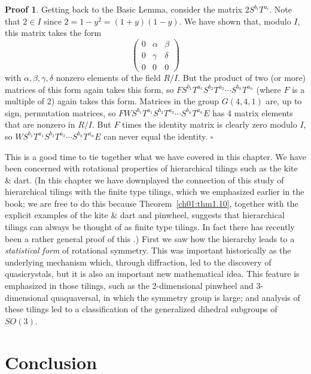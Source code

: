 \documentclass[reqno]{stml-l}
\theoremstyle{plain}
\theoremstyle{definition}
\newtheorem*{proof*}{Proof}
\numberwithin{equation}{chapter}
\begin{document}
\begin{proof*}
Getting back to the Basic Lemma, consider the matrix $2S^{b_{i}}T^{a_{i}}$. Note that $2\in I$ since $2=1-y^{2}=(1+y)(1-y)$. We have shown that, modulo $I$, this matrix takes the form
\begin{equation}\label{ch04:eqn4.34}
\left(\begin{array}{lll}
0 & \alpha & \beta\\
0 & \gamma & \delta\\
0 & 0 & 0
\end{array}\right)
\end{equation}
with $\alpha,\beta,\gamma,\delta$ nonzero elements of the field $R/I$. But the product of two (or more) matrices of this form again takes this form, so $FS^{b_{1}}T^{a_{1}}S^{b_{2}}T^{a_{2}}\cdots S^{b_{n}}T^{a_{n}}$ (where $F$ is a multiple of 2) again takes this form. Matrices in the group $G(4,4,1)$ are, up to sign, permutation matrices, so $FWS^{b_{1}}T^{a_{1}}S^{b_{2}}T^{a_{2}}\cdots S^{b_{n}}T^{a_{n}}E$ has 4 matrix elements that are nonzero in $R/I$. But $F$ times the identity matrix is clearly zero modulo $I$, so $WS^{b_{1}}T^{a_{1}}S^{b_{2}}T^{a_{2}}\cdots S^{b_{n}}T^{a_{n}}E$ can never equal the identity.
\hfill$\square$
\end{proof*}

This is a good time to tie together what we have covered in this chapter. We have been concerned with rotational properties of hierarchical tilings such as the kite \& dart. (In this chapter we have downplayed the connection of this study of hierarchical tilings with the finite type tilings, which we emphasized earlier in the book; we are free to do this because Theorem~\ref{ch01:thm1.10}, together with the explicit examples of the kite \& dart and pinwheel, suggests that hierarchical tilings can always be thought of as finite type tilings. In fact there has recently been a rather general proof of this \cite{bib:Goo}.) First we saw how the hierarchy leads to a \emph{statistical form} of rotational symmetry. This was important historically as the underlying mechanism which, through diffraction, led to the discovery of quasicrystals, but it is also an important new mathematical idea. This feature is emphasized in those tilings, such as the 2-dimensional pinwheel and 3-dimensional quaquaversal, in which the symmetry group is large; and analysis of these tilings led to a classification of the generalized dihedral subgroups of $SO(3)$.



\chapter{Conclusion\label{ch05:chap05}}
\end{document}
